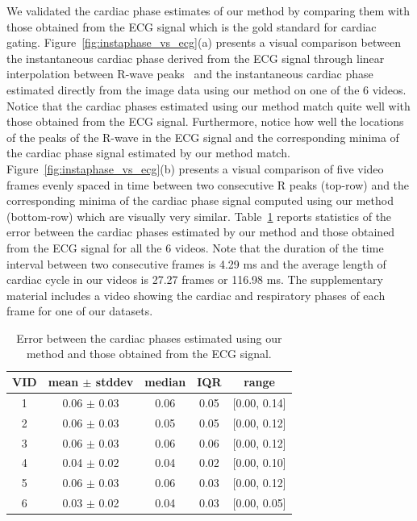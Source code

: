 \documentclass[journal]{IEEEtran}
\begin{document}
	We validated the cardiac phase estimates of our method by comparing them with those obtained from the ECG signal which is the gold standard for cardiac gating. Figure~\ref{fig:instaphase_vs_ecg}(a) presents a visual comparison between the instantaneous cardiac phase derived from the ECG signal through linear interpolation between R-wave peaks~\cite{Rosenblum2001,Freund2003} and the instantaneous cardiac phase estimated directly from the image data using our method on one of the 6 videos. Notice that the cardiac phases estimated using our method match quite well with those obtained from the ECG signal. Furthermore, notice how well the locations of the peaks of the R-wave in the ECG signal and the corresponding minima of the cardiac phase signal estimated by our method match. Figure~\ref{fig:instaphase_vs_ecg}(b) presents a visual comparison of five video frames evenly spaced in time between two consecutive R peaks (top-row) and the corresponding minima of the cardiac phase signal computed using our method (bottom-row) which are visually very similar. Table~\ref{table:phase_estimation_error} reports statistics of the error between the cardiac phases estimated by our method and those obtained from the ECG signal for all the 6 videos. Note that the duration of the time interval between two consecutive frames is 4.29 ms and the average length of cardiac cycle in our videos is 27.27 frames or 116.98 ms. The supplementary material includes a video showing the cardiac and respiratory phases of each frame for one of our datasets.

%	
\begin{table}[h]
\begin{minipage}[t]{0.95\linewidth}
\centering
\caption{Error between the cardiac phases estimated using our method and those obtained from the ECG signal.}
\begin{tabular}{|c|c|c|c|c|}
\hline
VID & mean $\pm$ stddev & median & IQR & range \\ \hline
1 & 0.06 $\pm$ 0.03 & 0.06 & 0.05 & {[}0.00, 0.14{]} \\ \hline
2 & 0.06 $\pm$ 0.03 & 0.05 & 0.05 & {[}0.00, 0.12{]} \\ \hline
3 & 0.06 $\pm$ 0.03 & 0.06 & 0.06 & {[}0.00, 0.12{]} \\ \hline
4 & 0.04 $\pm$ 0.02 & 0.04 & 0.02 & {[}0.00, 0.10{]} \\ \hline
5 & 0.06 $\pm$ 0.03 & 0.06 & 0.03 & {[}0.00, 0.12{]} \\ \hline
6 & 0.03 $\pm$ 0.02 & 0.04 & 0.03 & {[}0.00, 0.05{]} \\ \hline
\end{tabular}
\label{table:phase_estimation_error}
\end{minipage}
\end{table}	
%	
	
\end{document}
